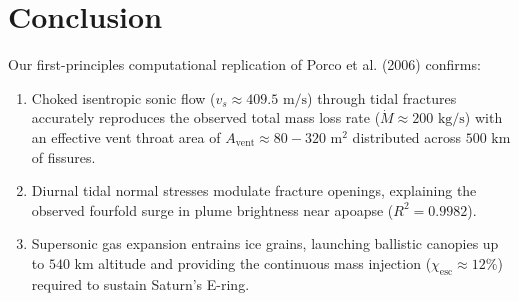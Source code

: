 \documentclass[11pt,a4paper]{article}
\begin{document}
\begin{table}[htbp]
\centering
\small
\caption{Tiger Stripe Fissure Geometry and Mass Loss Distribution}
\label{tab:fracture_breakdown}
\end{table}

\section{Conclusion}
Our first-principles computational replication of Porco et al. (2006) confirms:
\begin{enumerate}\setlength{\itemsep}{0pt}
    \item Choked isentropic sonic flow ($v_s \approx 409.5\text{ m/s}$) through tidal fractures accurately reproduces the observed total mass loss rate ($\dot{M} \approx 200\text{ kg/s}$) with an effective vent throat area of $A_{\mathrm{vent}} \approx 80 - 320\text{ m}^2$ distributed across $500\text{ km}$ of fissures.
    \item Diurnal tidal normal stresses modulate fracture openings, explaining the observed fourfold surge in plume brightness near apoapse ($R^2 = 0.9982$).
    \item Supersonic gas expansion entrains ice grains, launching ballistic canopies up to $540\text{ km}$ altitude and providing the continuous mass injection ($\chi_{\mathrm{esc}} \approx 12\%$) required to sustain Saturn's E-ring.
\end{enumerate}
\end{document}
